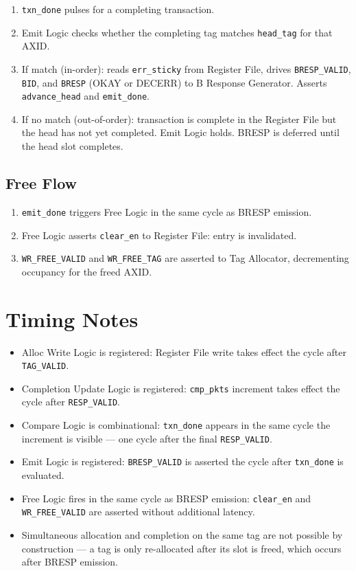 \documentclass[11pt,a4paper]{article}
\begin{document}
\begin{enumerate}
  \item \texttt{txn\_done} pulses for a completing transaction.
  \item Emit Logic checks whether the completing tag matches
        \texttt{head\_tag} for that AXID.
  \item If match (in-order): reads \texttt{err\_sticky} from Register
        File, drives \texttt{BRESP\_VALID}, \texttt{BID}, and
        \texttt{BRESP} (OKAY or DECERR) to B Response Generator.
        Asserts \texttt{advance\_head} and \texttt{emit\_done}.
  \item If no match (out-of-order): transaction is complete in the
        Register File but the head has not yet completed. Emit Logic
        holds. BRESP is deferred until the head slot completes.
\end{enumerate}

\subsection{Free Flow}

\begin{enumerate}
  \item \texttt{emit\_done} triggers Free Logic in the same cycle as
        BRESP emission.
  \item Free Logic asserts \texttt{clear\_en} to Register File:
        entry is invalidated.
  \item \texttt{WR\_FREE\_VALID} and \texttt{WR\_FREE\_TAG} are
        asserted to Tag Allocator, decrementing occupancy for the
        freed AXID.
\end{enumerate}

\section{Timing Notes}

\begin{itemize}
  \item Alloc Write Logic is registered: Register File write takes
        effect the cycle after \texttt{TAG\_VALID}.
  \item Completion Update Logic is registered: \texttt{cmp\_pkts}
        increment takes effect the cycle after \texttt{RESP\_VALID}.
  \item Compare Logic is combinational: \texttt{txn\_done} appears in
        the same cycle the increment is visible — one cycle after the
        final \texttt{RESP\_VALID}.
  \item Emit Logic is registered: \texttt{BRESP\_VALID} is asserted
        the cycle after \texttt{txn\_done} is evaluated.
  \item Free Logic fires in the same cycle as BRESP emission:
        \texttt{clear\_en} and \texttt{WR\_FREE\_VALID} are asserted
        without additional latency.
  \item Simultaneous allocation and completion on the same tag are not
        possible by construction — a tag is only re-allocated after its
        slot is freed, which occurs after BRESP emission.
\end{itemize}
\end{document}
